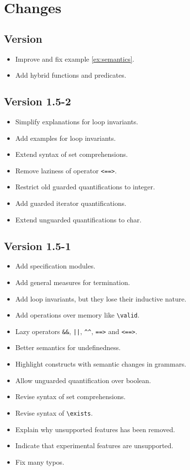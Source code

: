 \section{Changes}

\subsection{Version \version}

\begin{itemize}
\item Improve and fix example \ref{ex:semantics}.
\item Add hybrid functions and predicates.
\end{itemize}

\subsection{Version 1.5-2}

\begin{itemize}
\item Simplify explanations for loop invariants.
\item Add examples for loop invariants.
\item Extend syntax of set comprehensions.
\item Remove laziness of operator \lstinline|<==>|.
\item Restrict old guarded quantifications to integer.
\item Add guarded iterator quantifications.
\item Extend unguarded quantifications to char.
\end{itemize}

\subsection{Version 1.5-1}

\begin{itemize}
\item Add specification modules.
\item Add general measures for termination.
\item Add loop invariants, but they lose their inductive \acsl nature.
\item Add operations over memory like \lstinline|\valid|.
\item Lazy operators \lstinline|&&|, \lstinline+||+, \lstinline|^^|,
  \lstinline|==>| and \lstinline|<==>|.
\item Better semantics for undefinedness.
\item Highlight constructs with semantic changes in grammars.
\item Allow unguarded quantification over boolean.
\item Revise syntax of set comprehensions.
\item Revise syntax of \lstinline|\exists|.
\item Explain why unsupported features has been removed.
\item Indicate that experimental \acsl features are unsupported.
\item Fix many typos.
\end{itemize}


